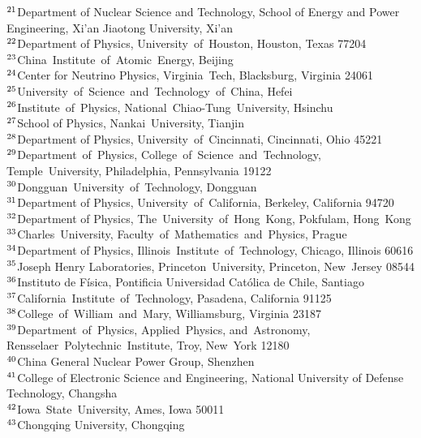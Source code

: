 {$^{21}$Department of Nuclear Science and Technology, School of Energy and Power Engineering, Xi'an Jiaotong University, Xi'an \\ 
$^{22}$Department of Physics, University~of~Houston, Houston, Texas  77204 \\ 
$^{23}$China~Institute~of~Atomic~Energy, Beijing \\ 
$^{24}$Center for Neutrino Physics, Virginia~Tech, Blacksburg, Virginia  24061 \\ 
$^{25}$University~of~Science~and~Technology~of~China, Hefei \\ 
$^{26}$Institute~of~Physics, National~Chiao-Tung~University, Hsinchu \\ 
$^{27}$School of Physics, Nankai~University, Tianjin \\ 
$^{28}$Department of Physics, University~of~Cincinnati, Cincinnati, Ohio 45221 \\ 
$^{29}$Department~of~Physics, College~of~Science~and~Technology, Temple~University, Philadelphia, Pennsylvania  19122 \\ 
$^{30}$Dongguan~University~of~Technology, Dongguan \\ 
$^{31}$Department of Physics, University~of~California, Berkeley, California  94720 \\ 
$^{32}$Department of Physics, The~University~of~Hong~Kong, Pokfulam, Hong~Kong \\ 
$^{33}$Charles~University, Faculty~of~Mathematics~and~Physics, Prague \\ 
$^{34}$Department of Physics, Illinois~Institute~of~Technology, Chicago, Illinois  60616 \\ 
$^{35}$Joseph Henry Laboratories, Princeton~University, Princeton, New~Jersey 08544 \\ 
$^{36}$Instituto de F\'isica, Pontificia Universidad Cat\'olica de Chile, Santiago \\ 
$^{37}$California~Institute~of~Technology, Pasadena, California 91125 \\ 
$^{38}$College~of~William~and~Mary, Williamsburg, Virginia  23187 \\ 
$^{39}$Department~of~Physics, Applied~Physics, and~Astronomy, Rensselaer~Polytechnic~Institute, Troy, New~York  12180 \\ 
$^{40}$China General Nuclear Power Group, Shenzhen \\ 
$^{41}$College of Electronic Science and Engineering, National University of Defense Technology, Changsha \\ 
$^{42}$Iowa~State~University, Ames, Iowa  50011 \\ 
$^{43}$Chongqing University, Chongqing \\ 
} 
